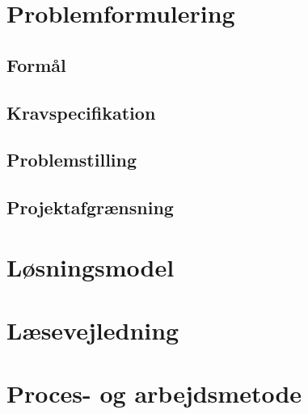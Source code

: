 
\section{Problemformulering}


\subsection{Formål}


\subsection{Kravspecifikation} \label{afs:kravspecifikation}

\subsection{Problemstilling}

\subsection{Projektafgrænsning}

\section{Løsningsmodel}

\section{Læsevejledning}

\section{Proces- og arbejdsmetode}
